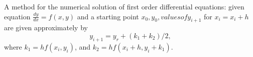 A method for the numerical solution of first order differential equations:
given equation $ \frac{dy}{dx} = f(x,y) $ and a starting point $x_{0}, y_{0}, values of y_{i+1}$  for $x_{i}=x_{i}+h$  are given approximately by
$$y_{i+1}=y_{r}+(k_{1}+k_{2})/2,$$
where $k_{1}=hf(x_{i}, y_{i})$, and  
$k_{2}=hf(x_{i}+h, y_{i}+k_{1}).$